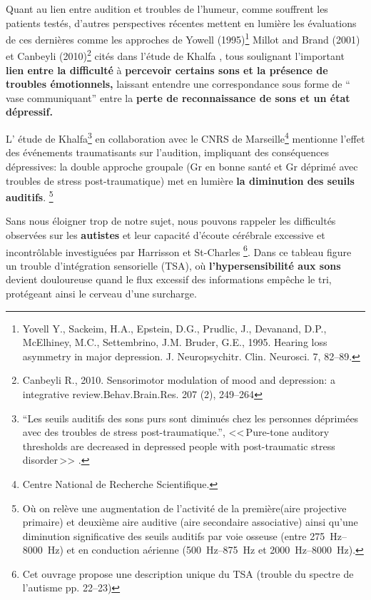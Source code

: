 Quant au lien entre audition et troubles de l'humeur, comme souffrent
les patients testés, d'autres perspectives
récentes mettent en lumière les évaluations de ces dernières comme les
approches de Yowell (1995)\footnote{Yovell
  Y., Sackeim, H.A., Epstein, D.G., Prudlic, J., Devanand, D.P.,
  McElhiney, M.C., Settembrino, J.M. Bruder, G.E., 1995. Hearing loss
  asymmetry in major depression. J. Neuropsychitr. Clin. Neurosci. 7,
  82--89.} Millot and Brand (2001) et
Canbeyli (2010)\footnote{Canbeyli R., 2010. Sensorimotor modulation of mood and
depression: a integrative review.Behav.Brain.Res. 207 (2), 249--264}
cités dans l'étude de Khalfa \autocite{affectiveDisorders}, tous soulignant
l'important\textbf{ lien entre la difficulté}
à \textbf{percevoir certains sons et la présence de troubles émotionnels,}
laissant entendre une correspondance sous forme de `` vase communiquant''
entre la \textbf{perte de reconnaissance de
sons et un état dépressif.}

L' étude de Khalfa\footnote{``Les seuils auditifs des sons purs
	sont diminués chez les personnes déprimées avec des
	troubles de stress post-traumatique.'', <<\,Pure-tone auditory
	thresholds are decreased in depressed people with post-traumatic stress
disorder\,>>
	.} \autocite{affectiveDisorders} en collaboration avec
le CNRS de Marseille\footnote{Centre National de Recherche Scientifique.}
 mentionne l'effet des événements
traumatisants sur l'audition, impliquant des conséquences dépressives:
la double approche groupale (Gr en bonne santé et Gr déprimé avec
troubles de stress post-traumatique) met en lumière \textbf{la diminution des
  seuils auditifs}. %
\footnote{Où on relève une augmentation de l'activité de la
première(aire projective primaire)  et deuxième aire auditive (aire
secondaire associative) ainsi qu'une diminution significative des
seuils auditifs par voie osseuse (entre
\SIrange{275}{8000}{\Hz}) et en conduction aérienne
(\SIrange{500}{875}{\Hz} et  \SIrange{2000}{8000}{\Hz}).}

Sans nous éloigner trop de notre sujet, nous pouvons rappeler
les difficultés observées sur les
\textbf{autistes} et leur capacité d'écoute cérébrale excessive et
incontrôlable investiguées par Harrisson et St-Charles \autocite {harrisson_autisme_2017}
\footnote{Cet ouvrage propose une description unique du TSA
   (trouble du spectre de l'autisme
   pp. 22--23)}. Dans ce tableau
 figure un trouble d'intégration sensorielle (TSA), où
 \textbf{l'hypersensibilité aux sons} devient douloureuse quand le flux excessif
 des
 informations empêche le tri,  protégeant ainsi le cerveau d'une surcharge.

